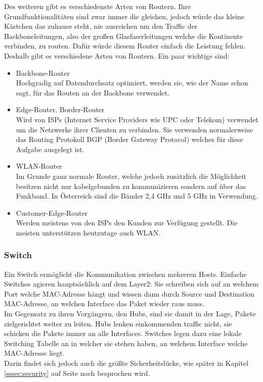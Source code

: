 \documentclass[11pt,a4paper]{report}
\begin{document}
Des weiteren gibt es verschiedenste Arten von Routern. Ihre Grundfunktionalitäten sind zwar immer die gleichen, jedoch würde das kleine Kästchen das zuhause steht, nie ausreichen um den Traffic der Backboneleitungen, also der großen Glasfaserleitungen welche die Kontinente verbinden, zu routen. Dafür würde diesem Router einfach die Leistung fehlen.\\
Deshalb gibt es verschiedene Arten von Routern. Ein paar wichtige sind:\\
\begin{itemize}
\item Backbone-Router\\
Hochgradig auf Datendurchsatz optimiert, werden sie, wie der Name schon sagt, für das Routen an der Backbone verwendet.
\item Edge-Router, Border-Router\\
Wird von ISPs (Internet Service Providers wie UPC oder Telekom) verwendet um die Netzwerke ihrer Clienten zu verbinden. Sie verwenden normalerweise das Routing Protokoll BGP (Border Gateway Protocol) welches für diese Aufgabe ausgelegt ist.
\item WLAN-Router\\
Im Grunde ganz normale Router, welche jedoch zusätzlich die Möglichkeit besitzen nicht nur kabelgebunden zu kommunizieren sondern auf über das Funkband. In Österreich sind die Bänder 2,4 GHz und 5 GHz in Verwendung.
\item Customer-Edge-Router\\
Werden meistens von den ISPs den Kunden zur Verfügung gestellt. Die meisten unterstützen heutzutage auch WLAN.
\end{itemize}
\subsubsection{Switch}
Ein Switch ermöglicht die Kommunikation zwischen mehreren Hosts. Einfache Switches agieren hauptsächlich auf dem Layer2: Sie schreiben sich auf an welchem Port welche MAC-Adresse hängt und wissen dann durch Source und Destination MAC-Adresse, an welchen Interface das Paket wieder raus muss.\\

Im Gegensatz zu ihren Vorgängern, den Hubs, sind sie damit in der Lage, Pakete zielgerichtet weiter zu leiten. Hubs lenken einkommenden traffic nicht, sie schicken die Pakete immer an alle Interfaces. Switches legen dazu eine lokale Switching Tabelle an in welcher sie stehen haben, an welchem Interface welche MAC-Adresse liegt.\\
Darin findet sich jedoch auch die größte Sicherheitslücke, wie später in Kapitel \ref{sssec:security} auf Seite \pageref{sssec:security} noch besprochen wird.\\
\end{document}

